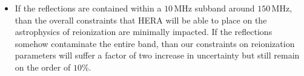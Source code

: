 \documentclass[twocolumn]{emulateapj}
\begin{document}
\begin{itemize}
\item If the reflections are contained within a $10$\,MHz subband around $150$\,MHz, than the overall constraints that HERA will be able to place on the astrophysics of reionization are minimally impacted. If the reflections somehow contaminate the entire band, than our constraints on reionization parameters will suffer a factor of two increase in uncertainty but still remain on the order of $10$\%. 
\end{itemize}

\label{sec:Conclusion}


\end{document}
